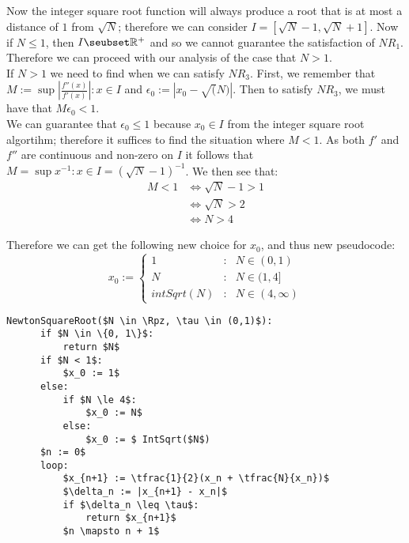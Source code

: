Now the integer square root function will always produce a root that is at most a distance of \(1\) from \(\sqrt{N}\); therefore we can consider \(I = [\sqrt{N} - 1, \sqrt{N} + 1]\). Now if \(N \le 1\), then \(I \seubset \Rp\) and so we cannot guarantee the satisfaction of \(NR_1\). Therefore we can proceed with our analysis of the case that \(N > 1\).\\

If \(N > 1\) we need to find when we can satisfy \(NR_3\). First, we remember that \(M := \sup{\left|\tfrac{f''(x)}{f'(x)}\right| : x \in I}\) and \(\epsilon_0 := \left|x_0 - \sqrt(N)\right|\). Then to satisfy \(NR_3\), we must have that \(M\epsilon_0 < 1\).\\

We can guarantee that \(\epsilon_0 \le 1\) because \(x_0 \in I\) from the integer square root algortihm; therefore it suffices to find the situation where \(M < 1\). As both \(f'\) and \(f''\) are continuous and non-zero on \(I\) it follows that \(M = \sup{x^{-1} : x \in I} = (\sqrt{N} - 1)^{-1}\). We then see that:
\begin{displaymath}
	\begin{align*}
		M < 1 &\iff \sqrt{N} - 1 > 1\\
			  &\iff \sqrt{N} > 2\\
			  &\iff N > 4
	\end{align*}
\end{displaymath}

Therefore we can get the following new choice for \(x_0\), and thus new pseudocode:
\begin{displaymath}
	x_0 := \left\{\begin{array}{lcl}
		1 &: &N \in (0,1)\\
		N &: &N \in (1,4]\\
		intSqrt(N) &: &N \in (4, \infty)
	\end{array}\right.
\end{displaymath}

\label{PCD_"Newton Square Root v2"}
\begin{lstlisting}[frame=single,mathescape,caption={Basic Newton Method for Square Root}]
  NewtonSquareRoot($N \in \Rpz, \tau \in (0,1)$):
      if $N \in \{0, 1\}$:
          return $N$
      if $N < 1$:
          $x_0 := 1$
      else:
          if $N \le 4$:
              $x_0 := N$
          else:
              $x_0 := $ IntSqrt($N$)
      $n := 0$
      loop:
          $x_{n+1} := \tfrac{1}{2}(x_n + \tfrac{N}{x_n})$
          $\delta_n := |x_{n+1} - x_n|$
          if $\delta_n \leq \tau$:
              return $x_{n+1}$
          $n \mapsto n + 1$
\end{lstlisting}

